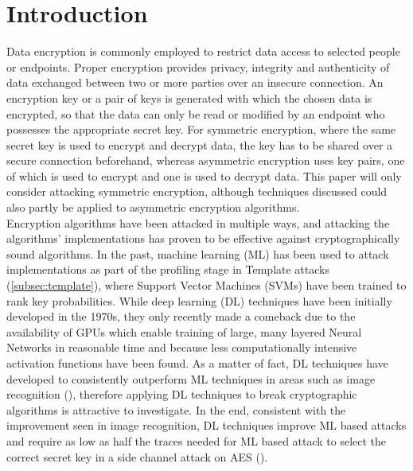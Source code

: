 \documentclass[journal]{IEEEtran}
\begin{document}
\section{Introduction}
Data encryption is commonly employed to restrict data access to selected people or endpoints. Proper encryption provides privacy, integrity and authenticity of data exchanged between two or more parties over an insecure connection. An encryption key or a pair of keys is generated with which the chosen data is encrypted, so that the data can only be read or modified by an endpoint who possesses the appropriate secret key. For symmetric encryption, where the same secret key is used to encrypt and decrypt data, the key has to be shared over a secure connection beforehand, whereas asymmetric encryption uses key pairs, one of which is used to encrypt and one is used to decrypt data. This paper will only consider attacking symmetric encryption, although techniques discussed could also partly be applied to asymmetric encryption algorithms. \\Encryption algorithms have been attacked in multiple ways, and attacking the algorithms' implementations has proven to be effective against cryptographically sound algorithms. In the past, machine learning (ML) has been used to attack implementations as part of the profiling stage in Template attacks (\autoref{subsec:template}), where Support Vector Machines (SVMs) have been trained to rank key probabilities. While deep learning (DL) techniques have been initially developed in the 1970s, they only recently made a comeback due to the availability of GPUs which enable training of large, many layered Neural Networks in reasonable time and because less computationally intensive activation functions have been found. As a matter of fact, DL techniques have developed to consistently outperform ML techniques in areas such as image recognition (\cite{cnn-beats-svm:alex}), therefore applying DL techniques to break cryptographic algorithms is attractive to investigate. In the end, consistent with the improvement seen in image recognition, DL techniques improve ML based attacks and require as low as half the traces needed for ML based attack to select the correct secret key in a side channel attack on AES ().  
\end{document}
